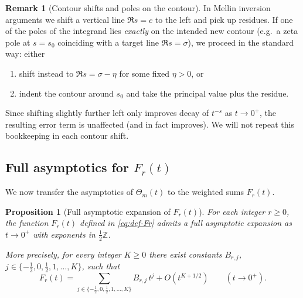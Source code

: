 \documentclass[11pt,letterpaper]{amsart}
\numberwithin{equation}{section}
\newtheorem{proposition}[theorem]{Proposition}
\theoremstyle{definition}
\newtheorem{remark}[theorem]{Remark}
\newcommand{\Z}{\mathbb{Z}}
\begin{document}
\begin{remark}[Contour shifts and poles on the contour]\label{rem:contour-shift}
In Mellin inversion arguments we shift a vertical line $\Re s=c$ to the left and pick up
residues. If one of the poles of the integrand lies \emph{exactly} on the intended new
contour (e.g.\ a zeta pole at $s=s_0$ coinciding with a target line $\Re s=\sigma$),
we proceed in the standard way: either
\begin{enumerate}[label=\textup{(\alph*)},leftmargin=2.2em]
\item shift instead to $\Re s=\sigma-\eta$ for some fixed $\eta>0$, or
\item indent the contour around $s_0$ and take the principal value plus the residue.
\end{enumerate}
Since shifting slightly further left only improves decay of $t^{-s}$ as $t\to0^+$, the resulting
error term is unaffected (and in fact improves). We will not repeat this bookkeeping in each
contour shift.
\end{remark}

\subsection{Full asymptotics for $F_r(t)$}\label{subsec:Fr-asymp}

We now transfer the asymptotics of $\Theta_m(t)$ to the weighted sums $F_r(t)$.

\begin{proposition}[Full asymptotic expansion of $F_r(t)$]\label{prop:Fr-asymp}
For each integer $r\ge 0$, the function $F_r(t)$ defined in \eqref{eq:def-Fr}
admits a full asymptotic expansion as $t\to 0^+$ with exponents in $\tfrac12\Z$.

More precisely, for every integer $K\ge 0$ there exist constants $B_{r,j}$,
$j\in\{-\tfrac12,0,\tfrac12,1,\dots,K\}$, such that
\begin{equation}\label{eq:Fr-K}
F_r(t)=\sum_{j\in\{-\tfrac12,0,\tfrac12,1,\dots,K\}}B_{r,j}\,t^{j}+O(t^{K+1/2})
\qquad(t\to 0^+).
\end{equation}
\end{proposition}
\end{document}

